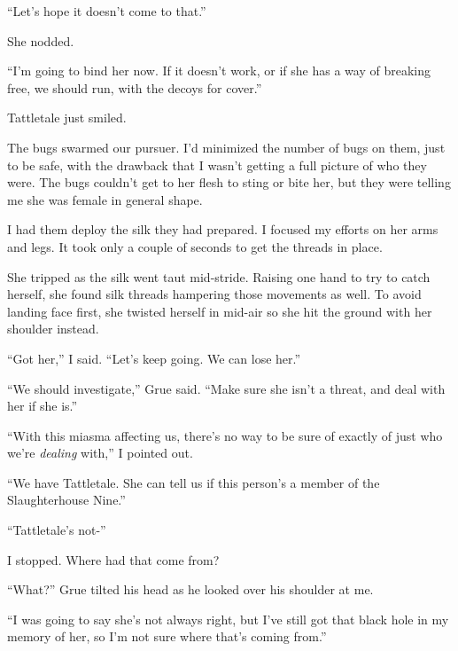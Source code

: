 ``Let's hope it doesn't come to that.''



She nodded.



``I'm going to bind her now.  If it doesn't work, or if she has a way of breaking free, we should run, with the decoys for cover.''



Tattletale just smiled.



The bugs swarmed our pursuer.  I'd minimized the number of bugs on them, just to be safe, with the drawback that I wasn't getting a full picture of who they were.  The bugs couldn't get to her flesh to sting or bite her, but they were telling me she was female in general shape.



I had them deploy the silk they had prepared.  I focused my efforts on her arms and legs.  It took only a couple of seconds to get the threads in place.



She tripped as the silk went taut mid-stride.  Raising one hand to try to catch herself, she found silk threads hampering those movements as well.  To avoid landing face first, she twisted herself in mid-air so she hit the ground with her shoulder instead.



``Got her,'' I said.  ``Let's keep going.  We can lose her.''



``We should investigate,'' Grue said.  ``Make sure she isn't a threat, and deal with her if she is.''



``With this miasma affecting us, there's no way to be sure of exactly of just who we're \emph{dealing} with,'' I pointed out.



``We have Tattletale.  She can tell us if this person's a member of the Slaughterhouse Nine.''



``Tattletale's not-''



I stopped.  Where had that come from?



``What?''  Grue tilted his head as he looked over his shoulder at me.



``I was going to say she's not always right, but I've still got that black hole in my memory of her, so I'm not sure where that's coming from.''



